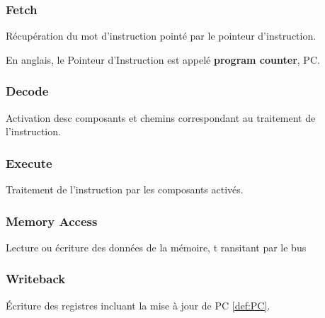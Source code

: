 \documentclass{article}
\begin{document}
\subsubsection{Fetch}
\begin{definition}\label{def:fetch}
    Récupération du mot d'instruction pointé par le pointeur d'instruction.

    \begin{remark}\label{def:PC}
        En anglais, le Pointeur d'Instruction est appelé \textbf{program counter}, PC.
    \end{remark}
\end{definition}

\subsubsection{Decode}
\begin{definition}\label{def:decode}
    Activation desc composants et chemins correspondant au traitement de l'instruction.
\end{definition}

\subsubsection{Execute}
\begin{definition}\label{def:execute}
    Traitement de l'instruction par les composants activés.
\end{definition}

\subsubsection{Memory Access}
\begin{definition}\label{def:memoryAccess}
    Lecture ou écriture des données de la mémoire, t    ransitant par le bus
\end{definition}

\subsubsection{Writeback}
\begin{definition}\label{def:writeBack}
    Écriture des registres incluant la mise à jour de PC \ref{def:PC}.
\end{definition}
\end{document}
